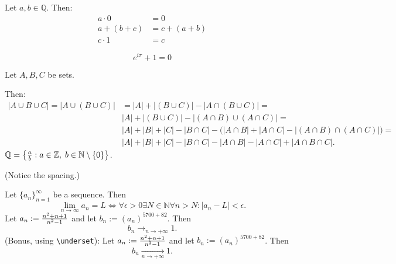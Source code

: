 \documentclass[a4paper]{article}
\begin{document}
Let $a,b\in\mathbb{Q}$. Then:
\begin{align}
    a\cdot0&=0\\
    a+(b+c)&=c+(a+b)\\
    c\cdot1&=c
\end{align}
\medskip

$$e^{i\pi}+1=0$$

Let $A,B,C$ be sets.

Then:
\begin{align*}
    |A\cup B\cup C|=|A\cup(B\cup C)|&=|A|+|(B\cup C)|-|A\cap(B\cup C)|=\\
    &|A|+|(B\cup C)|-|(A\cap B)\cup (A\cap C)|=\\
    &|A|+|B|+|C|-|B\cap C|-\Big(|A\cap B|+|A\cap C|-|(A\cap B)\cap(A\cap C)|\Big)=\\
    &|A|+|B|+|C|-|B\cap C|-|A\cap B|-|A\cap C|+|A\cap B\cap C|.
\end{align*}
$\mathbb{Q}=\left\{{a\over b}:a\in\mathbb{Z},\;b\in\mathbb{N}\setminus\{0\}\right\}$.

(Notice the spacing.)

Let $\{a_n\}_{n=1}^\infty$ be a sequence. Then
$$\lim\limits_{n\to\infty}a_n=L\iff\forall\epsilon>0\exists N\in\mathbb{N}\forall n>N:|a_n-L|<\epsilon.$$
Let $a_n:={n^2+n+1\over n^2-1}$ and let $b_n:=(a_n)^{5700+82}$. Then
$$b_n\to_{n\to+\infty}1.$$
(Bonus, using \verb+\underset+): Let $a_n:={n^2+n+1\over n^2-1}$ and let $b_n:=(a_n)^{5700+82}$. Then
$$b_n\xrightarrow[n\to+\infty]{}1.$$
\end{document}
